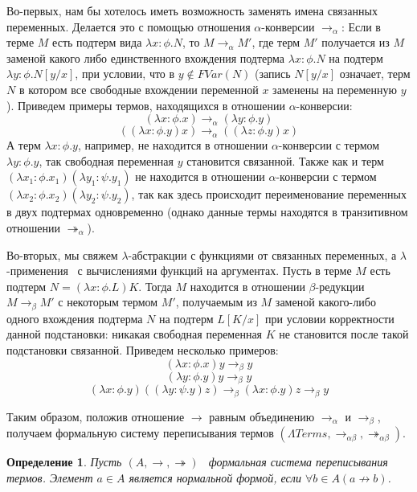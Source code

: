 \documentclass{article}[14pt]
\newtheorem{definition}{Определение}
\newcommand{\dash}{\textemdash\ }
\begin{document}
Во-первых, нам бы хотелось иметь возможность заменять имена связанных переменных. Делается
это с помощью отношения $\alpha$-конверсии $\rightarrow_\alpha$: Если в терме $M$ есть подтерм вида
$\lambda x : \phi . N$, то $M \rightarrow_\alpha M'$, где терм $M'$ получается из $M$ заменой
какого либо единственного вхождения подтерма $\lambda x : \phi . N$ на подтерм $\lambda y : \phi . N[y/x]$, при условии, что
в $y \not \in FVar(N)$ (запись $N[y/x]$ означает, терм $N$ в котором все свободные вхождении переменной
$x$ заменены на переменную $y$). Приведем примеры термов, находящихся в отношении $\alpha$-конверсии:
$$(\lambda x : \phi . x) \rightarrow_\alpha (\lambda y : \phi . y)$$
$$((\lambda x : \phi . y) x) \rightarrow_\alpha ((\lambda z : \phi . y) x)$$
А терм $\lambda x : \phi . y$, например, не находится в отношении $\alpha$-конверсии с термом
$\lambda y : \phi . y$, так свободная переменная $y$ становится связанной. Также как и
терм $(\lambda x_1 : \phi . x_1)(\lambda y_1 : \psi . y_1)$ не находится в отношении $\alpha$-конверсии
с термом $(\lambda x_2 : \phi . x_2)(\lambda y_2 : \psi . y_2)$, так как
здесь происходит переименование переменных в двух подтермах одновременно (однако данные термы
находятся в транзитивном отношении $\twoheadrightarrow_\alpha$).

Во-вторых, мы свяжем $\lambda$-абстракции с функциями от связанных переменных,
а $\lambda$-применения \dash с вычислениями функций на аргументах.
Пусть в терме $M$ есть подтерм $N = (\lambda x : \phi . L)K$. Тогда $M$ 
находится в отношении  $\beta$-редукции $M \rightarrow_\beta M'$ с некоторым термом $M'$, 
получаемым из $M$ заменой какого-либо одного вхождения подтерма $N$ на подтерм
$L[K/x]$ при условии корректности данной подстановки: никакая свободная переменная $K$ не
становится после такой подстановки связанной. Приведем несколько примеров:
$$(\lambda x : \phi . x) y \rightarrow_\beta y$$
$$(\lambda y : \phi . y) y \rightarrow_\beta y$$
$$(\lambda x : \phi . y)((\lambda y : \psi . y) z) \rightarrow_\beta (\lambda x : \phi . y) z \rightarrow_\beta y$$

Таким образом, положив отношение $\rightarrow$ равным объединению $\rightarrow_\alpha$ и $\rightarrow_\beta$,
получаем формальную систему переписывания термов $(\Lambda Terms, \rightarrow_{\alpha \beta}, \twoheadrightarrow_{\alpha \beta})$.

\begin{definition}
    \label{NormalFormDefinition}
    Пусть $(A, \rightarrow, \twoheadrightarrow)$ \dash формальная система переписывания термов.
    Элемент $a \in A$ является нормальной формой, если $\forall b \in A (a \not \rightarrow b)$.
\end{definition}
\end{document}
